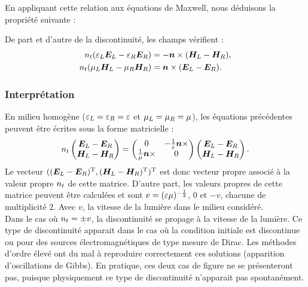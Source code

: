 En appliquant cette relation aux équations de Maxwell, nous déduisons la
propriété suivante :
\begin{proposition}
	De part et d’autre de la discontinuité, les champs vérifient :
	\begin{subequations}
		\begin{align}
		n_{t} (\varepsilon_L \bm{E}_L - \varepsilon_R \bm{E}_R) &= - \bm{n} \times (\bm{H}_L - \bm{H}_R) ,
		\\
		n_{t} (\mu_L \bm{H}_L - \mu_R \bm{H}_R) &= \bm{n} \times (\bm{E}_L - \bm{E}_R) .
		\end{align}
	\end{subequations}
\end{proposition}


\subsubsection{Interprétation}
\label{sssect:rankine-hugoniot_interpretation}

En milieu homogène ($\varepsilon_L = \varepsilon_R = \varepsilon$
et $\mu_L = \mu_R = \mu$), les équations précédentes
peuvent être écrites sous la forme matricielle :
\begin{align}
	n_{t}
	\begin{pmatrix}
		\bm{E}_L - \bm{E}_R \\
		\bm{H}_L - \bm{H}_R
	\end{pmatrix} =
	\begin{pmatrix}
		0 & - \frac{1}{\varepsilon} \bm{n} \times \\
		\frac{1}{\mu} \bm{n} \times & 0
	\end{pmatrix}
	\begin{pmatrix}
		\bm{E}_L - \bm{E}_R \\
		\bm{H}_L - \bm{H}_R
	\end{pmatrix} .
\end{align}
Le vecteur $((\bm{E}_L - \bm{E}_R)^{\mathrm{T}}, (\bm{H}_L - \bm{H}_R)^{\mathrm{T}})^{\mathrm{T}}$
est donc vecteur propre associé à la valeur propre $n_{t}$ de cette matrice.
D'autre part, les valeurs propres de cette matrice peuvent être calculées
et sont $v = (\varepsilon \mu)^{-\frac{1}{2}}$, $0$
et $-v$, chacune de multiplicité $2$.
Avec $v$, la vitesse de la lumière dans le milieu considéré.
\\

Dans le cas où $n_{t} = \pm v$, la discontinuité se propage à la vitesse de la lumière.
Ce type de discontinuité apparait dans le cas où la condition initiale est
discontinue ou pour des sources électromagnétiques de type mesure de Dirac.
Les méthodes d’ordre élevé ont du mal à reproduire correctement ces solutions
(apparition d'oscillations de Gibbs). En pratique, ces deux cas de figure ne se présenteront pas,
puisque physiquement ce type de discontinuité n’apparait pas spontanément.

